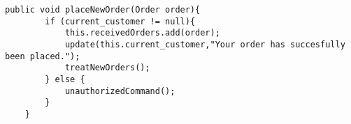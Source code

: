 \begin{lstlisting}[caption=Method to place an \texttt{Order} of \texttt{Core}.,
label=lst:placeOrder]
public void placeNewOrder(Order order){
		if (current_customer != null){
			this.receivedOrders.add(order);
			update(this.current_customer,"Your order has succesfully been placed.");
			treatNewOrders();
		} else {
			unauthorizedCommand();
		}
	}
\end{lstlisting}

\lstset{basicstyle=\rm\small\ttfamily}
